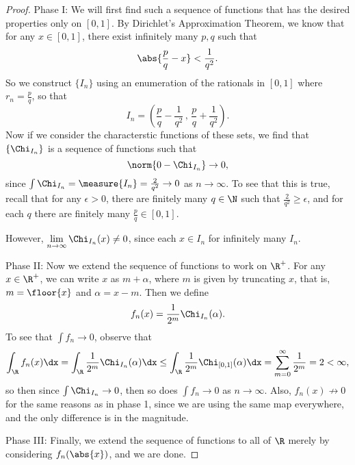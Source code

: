 \documentclass[letterpaper]{article}
\begin{document}
\begin{enumerate}
[Hint: In $\R$, let $f_n=\Chi_{I_n}$, where $I_n$ is an appropriately chosen sequence of intervals with $\measure{I_n}\to 0$.]
\begin{proof}
  Phase I: We will first find such a sequence of functions that has the desired properties only on $[0,1]$. By Dirichlet's Approximation Theorem, we know that for any $x\in[0,1]$, there exist infinitely many $p,q$ such that
  $$\abs{\frac{p}{q}-x}<\frac{1}{q^2}.$$
  So we construct $\{I_n\}$ using an enumeration of the rationals in $[0,1]$ where $r_n=\frac{p}{q}$, so that
  $$I_n=\left(\frac{p}{q}-\frac{1}{q^2}\,,\, \frac{p}{q}+\frac{1}{q^2}\right).$$
  Now if we consider the characterstic functions of these sets, we find that $\{\Chi_{I_n}\}$ is a sequence of functions such that
  $$\norm{0-\Chi_{I_n}}\to 0,$$
  since $\int \Chi_{I_n} = \measure{I_n} = \frac{2}{q^2} \to 0$ as $n\to\infty$. To see that this is true, recall that for any $\epsilon>0$, there are finitely many $q\in\N$ such that $\frac{2}{q^2}\geq\epsilon$, and for each $q$ there are finitely many $\frac{p}{q}\in[0,1]$.

  However, $\lim\limits_{n\to\infty}\Chi_{I_n}(x)\neq0$, since each $x\in I_n$ for infinitely many $I_n$. 

  Phase II: Now we extend the sequence of functions to work on $\R^+$. For any $x\in\R^+$, we can write $x$ as $m+\alpha$, where $m$ is given by truncating $x$, that is, $m=\floor{x}$ and $\alpha = x-m$. Then we define 
  $$f_n(x)=\frac{1}{2^m}\Chi_{I_n}(\alpha).$$
  To see that $\int f_n\to0$, observe that 
  $$\int_\R f_n(x)\dx=\int_\R\frac{1}{2^m}\Chi_{I_n}(\alpha)\dx\leq\int_\R\frac{1}{2^m}\Chi_{[0,1]}(\alpha)\dx=\sum_{m=0}^\infty \frac{1}{2^m}=2<\infty,$$
  so then since $\int\Chi_{I_n}\to0$, then so does $\int f_n\to0$ as $n\to\infty$. Also, $f_n(x)\not\to 0$ for the same reasons as in phase 1, since we are using the same map everywhere, and the only difference is in the magnitude. 
  
  Phase III: Finally, we extend the sequence of functions to all of $\R$ merely by considering $f_n(\abs{x})$, and we are done. 
\end{proof}


\end{enumerate}
\end{document}

